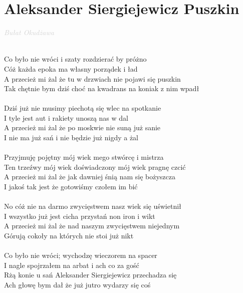 \documentclass[a5paper, 10pt]{book}
\begin{document}
\newpage
\section{Aleksander Siergiejewicz Puszkin}\textcolor{lightgray}{\textit{Bułat Okudżawa}}\\~\\
\begin{minipage}[t]{0.8\textwidth}
  Co było nie wróci i szaty rozdzierać by próżno\\
  Cóż każda epoka ma własny porządek i ład\\
  A przecież mi żal że tu w drzwiach nie pojawi się puszkin\\
  Tak chętnie bym dziś choć na kwadrans na koniak z nim wpadł\\
  \\
  Dziś już nie musimy piechotą się wlec na spotkanie\\
  I tyle jest aut i rakiety unoszą nas w dal\\
  A przecież mi żal że po moskwie nie suną już sanie\\
  I nie ma już sań i nie będzie już nigdy a żal\\
  \\
  Przyjmuję pojętny mój wiek mego stwórcę i mistrza\\
  Ten trzeźwy mój wiek doświadczony mój wiek pragnę czcić\\
  A przecież mi żal że jak dawniej śnią nam się bożyszcza\\
  I jakoś tak jest że gotowiśmy czołem im bić\\
  \\
  No cóż nie na darmo zwycięstwem nasz wiek się uświetnił\\
  I wszystko już jest cicha przystań non iron i wikt\\
  A przecież mi żal że nad naszym zwycięstwem niejednym\\
  Górują cokoły na których nie stoi już nikt\\
  \\
  Co było nie wróci; wychodzę wieczorem na spacer\\
  I nagle spojrzałem na arbat i ach co za gość\\
  Rżą konie u sań Aleksander Siergiejewicz przechadza się\\
  Ach głowę bym dał że już jutro wydarzy się coś\\
\end{minipage}
\end{document}
